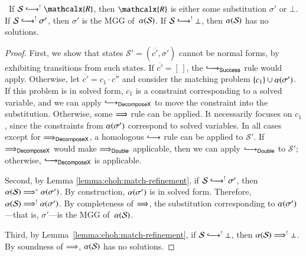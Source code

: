 \begin{lemma}\label{lemma:ehoh:refined-match-partial-correctness}\,%
  If $\mathcal{S} \Matchiiarrow^{!} \mathcalx{R}$, then $\mathcalx{R}$ is either
  some substitution $\sigma'$ or $\bot$.
  If $\mathcal{S} \Matchiiarrow^{!} \sigma'$, then $\sigma'$ is the MGG
  of~$\alpha(\mathcal{S})$.
  If $\mathcal{S} \Matchiiarrow^{!} \bot$, then $\alpha(\mathcal{S})$ has
  no solutions.
  \end{lemma}
\begin{proof}
  
  First, we show that states $\mathcal{S}' = (\overline{c'}, \sigma')$ cannot be
  normal forms, by exhibiting transitions from such states. If $\overline{c'} =
  [\,]$, the $\Matchiiarrow_{\mathsf{Success}}$ rule would apply. Otherwise, let
  $\overline{c'} = c_1 \cdot \overline{c''}$ and consider the matching problem
  $\{c_1\} \cup \alpha(\sigma')$. If this problem is in solved form, $c_1$
  is a constraint corresponding to a solved variable, and we can apply
  $\Matchiiarrow_{\mathsf{DecomposeX}}$ to move the constraint into the
  substitution. Otherwise, some $\Longrightarrow$ rule can be applied. It
  necessarily focuses on $c_1$, since the constraints from
  $\alpha(\sigma')$ correspond to solved variables. In all cases except for
  $\Longrightarrow_{\mathsf{DecomposeX}}$, a homologous
  $\Matchiiarrow$ rule  can be applied to $\mathcal{S}'$. If $\Longrightarrow_{\mathsf{DecomposeX}}$
  would make $\Longrightarrow_{\mathsf{Double}}$ applicable, then we can apply $\Matchiiarrow_{\mathsf{Double}}$ to $\mathcal{S}'$;
  otherwise, $\Matchiiarrow_{\mathsf{DecomposeX}}$ is applicable.
  
  Second, by Lemma \ref{lemma:ehoh:match-refinement},
  if $\mathcal{S} \Matchiiarrow^{!} \sigma'$, then
  $\alpha(\mathcal{S}) \Longrightarrow^* \alpha(\sigma')$.
  By construction, $\alpha(\sigma')$ is in solved form.
  Therefore, $\alpha(\mathcal{S}) \Longrightarrow^{!} \alpha(\sigma')$.
  By completeness of $\Longrightarrow$, the substitution corresponding to
  $\alpha(\sigma')$---that is, $\sigma'$---is the MGG of~$\alpha(\mathcal{S})$.
  
  Third, by Lemma~\ref{lemma:ehoh:match-refinement}, if $\mathcal{S}
  \Matchiiarrow^{!} \bot$, then $\alpha(\mathcal{S}) \Longrightarrow^{!} \bot$.
  By soundness of $\Longrightarrow$, $\alpha(\mathcal{S})$ has
  no solutions.
\end{proof}


